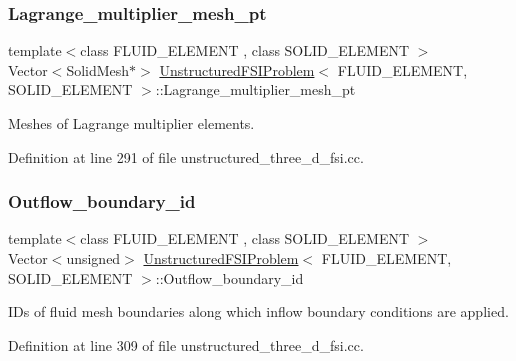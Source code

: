\subsubsection{\texorpdfstring{Lagrange\+\_\+multiplier\+\_\+mesh\+\_\+pt}{Lagrange\_multiplier\_mesh\_pt}}
{\footnotesize\ttfamily template$<$class F\+L\+U\+I\+D\+\_\+\+E\+L\+E\+M\+E\+NT , class S\+O\+L\+I\+D\+\_\+\+E\+L\+E\+M\+E\+NT $>$ \\
Vector$<$Solid\+Mesh$\ast$$>$ \hyperlink{classUnstructuredFSIProblem}{Unstructured\+F\+S\+I\+Problem}$<$ F\+L\+U\+I\+D\+\_\+\+E\+L\+E\+M\+E\+NT, S\+O\+L\+I\+D\+\_\+\+E\+L\+E\+M\+E\+NT $>$\+::Lagrange\+\_\+multiplier\+\_\+mesh\+\_\+pt\hspace{0.3cm}{\ttfamily [private]}}



Meshes of Lagrange multiplier elements. 



Definition at line 291 of file unstructured\+\_\+three\+\_\+d\+\_\+fsi.\+cc.

\mbox{\label{classUnstructuredFSIProblem_ab3ca6da48fb75f5b56cd2f0b581a2da0}} 
\subsubsection{\texorpdfstring{Outflow\+\_\+boundary\+\_\+id}{Outflow\_boundary\_id}}
{\footnotesize\ttfamily template$<$class F\+L\+U\+I\+D\+\_\+\+E\+L\+E\+M\+E\+NT , class S\+O\+L\+I\+D\+\_\+\+E\+L\+E\+M\+E\+NT $>$ \\
Vector$<$unsigned$>$ \hyperlink{classUnstructuredFSIProblem}{Unstructured\+F\+S\+I\+Problem}$<$ F\+L\+U\+I\+D\+\_\+\+E\+L\+E\+M\+E\+NT, S\+O\+L\+I\+D\+\_\+\+E\+L\+E\+M\+E\+NT $>$\+::Outflow\+\_\+boundary\+\_\+id\hspace{0.3cm}{\ttfamily [private]}}



I\+Ds of fluid mesh boundaries along which inflow boundary conditions are applied. 



Definition at line 309 of file unstructured\+\_\+three\+\_\+d\+\_\+fsi.\+cc.

\mbox{\label{classUnstructuredFSIProblem_a788dde635a29da6a40b21629780eb9b8}} 
